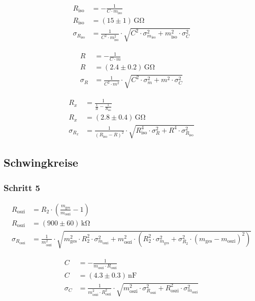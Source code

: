 \documentclass[12pt,a4paper,titlepage,headinclude,bibtotoc]{scrartcl}
\begin{document}
\begin{align*}
	R_\text{iso}&=- \frac{1}{C \cdot m_\text{iso}}\\
	R_\text{iso}&=\left(15 \pm 1\right)\, \si{\giga\ohm}\\
	\sigma_{R_\text{iso}}&=\frac{1}{C^{2} \cdot m_\text{iso}^{2}} \cdot \sqrt{C^{2} \cdot \sigma_{m_\text{iso}}^{2} + m_\text{iso}^{2} \cdot \sigma_{C}^{2}}
\end{align*}

\begin{align*}
	R&=- \frac{1}{C \cdot m}\\
	R&=\left(2.4 \pm 0.2\right) \, \si{\giga\ohm}\\
	\sigma_{R}&=\frac{1}{C^{2} \cdot m^{2}} \cdot \sqrt{C^{2} \cdot \sigma_{m}^{2} + m^{2} \cdot \sigma_{C}^{2}}
\end{align*}

\begin{align*}
	R_x&=\frac{1}{\frac{1}{R} - \frac{1}{R_\text{iso}}}\\
	R_x&=\left(2.8 \pm 0.4\right) \, \si{\giga\ohm}\\
	\sigma_{R_x}&=\frac{1}{\left(R_\text{iso} - R\right)^{2}} \cdot \sqrt{R_\text{iso}^{4} \cdot \sigma_{R}^{2} + R^{4} \cdot \sigma_{R_\text{iso}}^{2}}
\end{align*}

\subsection{Schwingkreise}
\subsubsection{Schritt 5}
\begin{align*}
	R_\text{oszi}&=R_2 \cdot \left(\frac{m_\text{ges}}{m_\text{oszi}} - 1\right)\\
	R_\text{oszi}&=\left(900 \pm 60\right) \, \si{\kilo\ohm}\\
	\sigma_{R_\text{oszi}}&=\frac{1}{m_\text{oszi}^{2}} \cdot \sqrt{m_\text{ges}^{2} \cdot R_2^{2} \cdot \sigma_{m_\text{oszi}}^{2} + m_\text{oszi}^{2} \cdot \left(R_2^{2} \cdot \sigma_{m_\text{ges}}^{2} + \sigma_{R_2}^{2} \cdot \left(m_\text{ges} - m_\text{oszi}\right)^{2}\right)}
\end{align*}

\begin{align*}
	C&=- \frac{1}{m_\text{oszi} \cdot R_\text{oszi}}\\
	C&=\left(4.3 \pm 0.3\right) \, \si{\nano\farad}\\
	\sigma_{C}&=\frac{1}{m_\text{oszi}^{2} \cdot R_\text{oszi}^{2}} \cdot \sqrt{m_\text{oszi}^{2} \cdot \sigma_{R_\text{oszi}}^{2} + R_\text{oszi}^{2} \cdot \sigma_{m_\text{oszi}}^{2}}
\end{align*}
\end{document}

